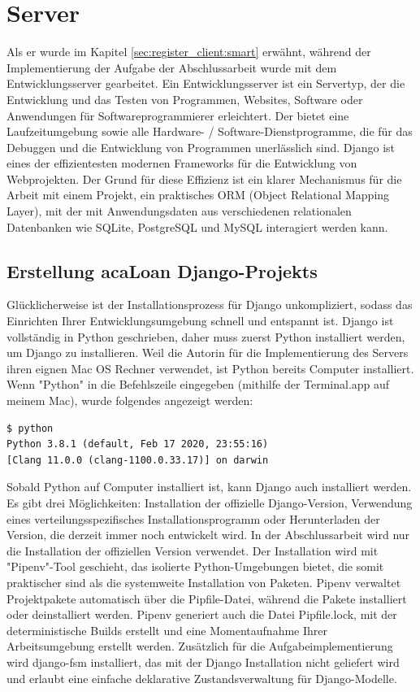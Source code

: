 \section{Server}
\label{sec:server}
Als er wurde im Kapitel \ref{sec:register_client:smart} erwähnt, während der Implementierung der Aufgabe der Abschlussarbeit wurde mit dem Entwicklungsserver gearbeitet. Ein Entwicklungsserver ist ein Servertyp, der die Entwicklung und das Testen von Programmen, Websites, Software oder Anwendungen für Softwareprogrammierer erleichtert. Der bietet eine Laufzeitumgebung sowie alle Hardware- / Software-Dienstprogramme, die für das Debuggen und die Entwicklung von Programmen unerlässlich sind. Django ist eines der effizientesten modernen Frameworks für die Entwicklung von Webprojekten. Der Grund für diese Effizienz ist ein klarer Mechanismus für die Arbeit mit einem Projekt, ein praktisches ORM (Object Relational Mapping Layer), mit der mit Anwendungsdaten aus verschiedenen relationalen Datenbanken wie SQLite, PostgreSQL und MySQL interagiert werden kann.

\subsection{Erstellung acaLoan Django-Projekts}
\label{sec:server:install}
Glücklicherweise ist der Installationsprozess für Django unkompliziert, sodass das Einrichten Ihrer Entwicklungsumgebung schnell und entspannt ist. Django ist vollständig in Python geschrieben, daher muss zuerst Python installiert werden, um Django zu installieren. Weil die Autorin für die Implementierung des Servers ihren eignen Mac OS Rechner verwendet, ist Python bereits Computer installiert. Wenn "Python" in die Befehlszeile eingegeben (mithilfe der Terminal.app auf meinem Mac), wurde folgendes angezeigt werden:
\begin{lstlisting}[caption={[Python Version überprüfen ] },captionpos=b]
$ python
Python 3.8.1 (default, Feb 17 2020, 23:55:16) 
[Clang 11.0.0 (clang-1100.0.33.17)] on darwin
\end{lstlisting}

Sobald Python auf Computer installiert ist, kann Django auch installiert werden. Es gibt drei Möglichkeiten: Installation der offizielle Django-Version, Verwendung eines verteilungsspezifisches Installationsprogramm oder Herunterladen der Version, die derzeit immer noch entwickelt wird. In der Abschlussarbeit wird nur die Installation der offiziellen Version verwendet. Der Installation wird mit "Pipenv"-Tool geschieht, das isolierte Python-Umgebungen bietet, die somit praktischer sind als die systemweite Installation von Paketen. Pipenv verwaltet Projektpakete automatisch über die Pipfile-Datei, während die Pakete installiert oder deinstalliert werden. Pipenv generiert auch die Datei Pipfile.lock, mit der deterministische Builds erstellt und eine Momentaufnahme Ihrer Arbeitsumgebung erstellt werden. Zusätzlich für die Aufgabeimplementierung wird django-fsm installiert, das mit der Django Installation nicht geliefert wird und erlaubt eine einfache deklarative Zustandsverwaltung für Django-Modelle. 


